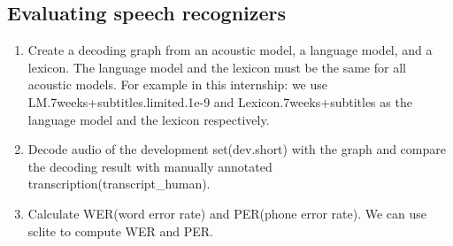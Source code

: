 \subsection{Evaluating speech recognizers}
\begin{enumerate}
\item Create a decoding graph from an acoustic model, a language model, and a lexicon. The language model and the lexicon must be the same for all acoustic models. For example in this internship: we  use LM.7weeks+subtitles.limited.1e-9 and Lexicon.7weeks+subtitles as the language model and the lexicon respectively.
\item Decode audio of the development set(dev.short) with the graph and compare the decoding result with manually annotated transcription(transcript\_human).
\item Calculate WER(word error rate) and PER(phone error rate). We can use sclite to compute WER and PER.
\end{enumerate}





